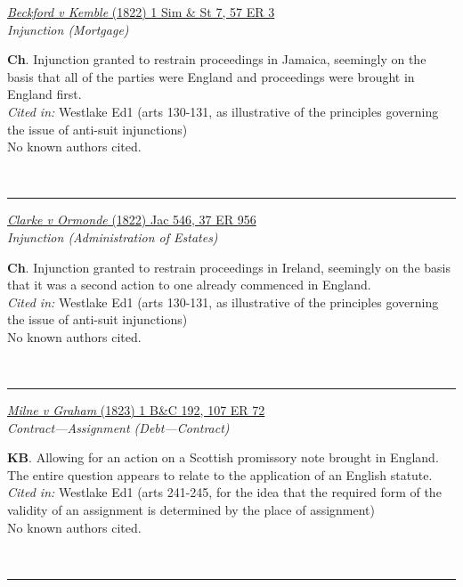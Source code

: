 \documentclass[twoside]{article}
\begin{document}
        \begin{small}
        \begin{center}
        \href{https://heinonline.org/HOL/P?h=hein.engrep/engre0057&i=11}{\textit{Beckford v Kemble} (1822) 1 Sim \& St 7, 57 ER 3} \label{63} \\ 
\textit{Injunction (Mortgage)}\\
        \end{center}
        \textbf{Ch}. Injunction granted to restrain proceedings in Jamaica, seemingly on the basis that all of the parties were England and proceedings were brought in England first.\\\textit{Cited in: }Westlake Ed1 (arts 130-131, as illustrative of the principles governing the issue of anti-suit injunctions)\\No known authors cited.
        \end{small}\\
        \rule{\textwidth}{0.5pt}
        

        \begin{small}
        \begin{center}
        \href{https://heinonline.org/HOL/P?h=hein.engrep/engrc0037&i=964}{\textit{Clarke v Ormonde} (1822) Jac 546, 37 ER 956} \label{66} \\ 
\textit{Injunction (Administration of Estates)}\\
        \end{center}
        \textbf{Ch}. Injunction granted to restrain proceedings in Ireland, seemingly on the basis that it was a second action to one already commenced in England.\\\textit{Cited in: }Westlake Ed1 (arts 130-131, as illustrative of the principles governing the issue of anti-suit injunctions)\\No known authors cited.
        \end{small}\\
        \rule{\textwidth}{0.5pt}
        

        \begin{small}
        \begin{center}
        \href{https://heinonline.org/HOL/P?h=hein.engrep/engrf0107&i=76}{\textit{Milne v Graham} (1823) 1 B\&C 192, 107 ER 72} \label{48} \\ 
\textit{Contract---Assignment (Debt---Contract)}\\
        \end{center}
        \textbf{KB}. Allowing for an action on a Scottish promissory note brought in England. The entire question appears to relate to the application of an English statute.\\\textit{Cited in: }Westlake Ed1 (arts 241-245, for the idea that the required form of the validity of an assignment is determined by the place of assignment)\\No known authors cited.
        \end{small}\\
        \rule{\textwidth}{0.5pt}
        
\end{document}

